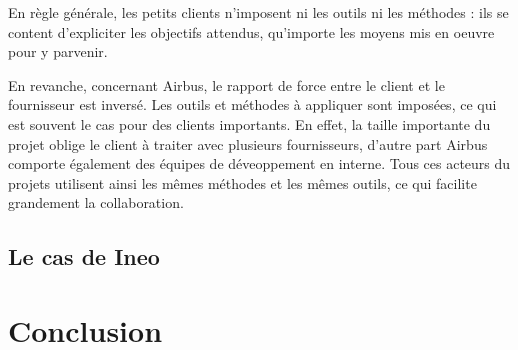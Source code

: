 En règle générale, les petits clients n'imposent ni les outils ni les méthodes : ils se content d'expliciter les objectifs attendus, qu'importe les moyens mis en oeuvre pour y parvenir.

En revanche, concernant Airbus, le rapport de force entre le client et le fournisseur est inversé. Les outils et méthodes à appliquer sont imposées, ce qui est souvent le cas pour des clients importants. En effet, la taille importante du projet oblige le client à traiter avec plusieurs fournisseurs, d'autre part Airbus comporte également des équipes de déveoppement en interne. Tous ces acteurs du projets utilisent ainsi les mêmes méthodes et les mêmes outils, ce qui facilite grandement la collaboration.

\subsection{Le cas de Ineo}



\section{Conclusion}
